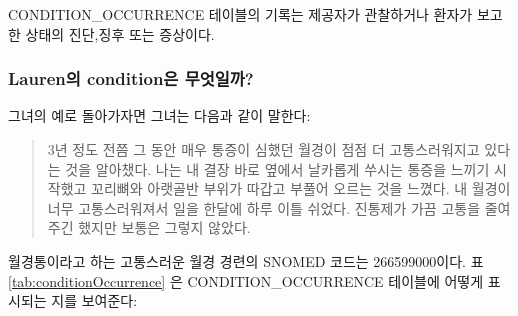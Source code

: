 \documentclass[11pt]{book}
\theoremstyle{definition}
\theoremstyle{definition}
\theoremstyle{definition}
\theoremstyle{remark}
\begin{document}
CONDITION\_OCCURRENCE 테이블의 기록는 제공자가 관찰하거나 환자가 보고한
상태의 진단,징후 또는 증상이다.

\subsubsection*{Lauren의 condition은 무엇일까?}\label{lauren-condition-}

그녀의 예로 돌아가자면 그녀는 다음과 같이 말한다:

\begin{quote}
3년 정도 전쯤 그 동안 매우 통증이 심했던 월경이 점점 더 고통스러워지고
있다는 것을 알아챘다. 나는 내 결장 바로 옆에서 날카롭게 쑤시는 통증을
느끼기 시작했고 꼬리뼈와 아랫골반 부위가 따갑고 부풀어 오르는 것을
느꼈다. 내 월경이 너무 고통스러워져서 일을 한달에 하루 이틀 쉬었다.
진통제가 가끔 고통을 줄여 주긴 했지만 보통은 그렇지 않았다.
\end{quote}

월경통이라고 하는 고통스러운 월경 경련의 SNOMED 코드는 266599000이다. 표
\ref{tab:conditionOccurrence} 은 CONDITION\_OCCURRENCE 테이블에 어떻게
표시되는 지를 보여준다:
\end{document}
